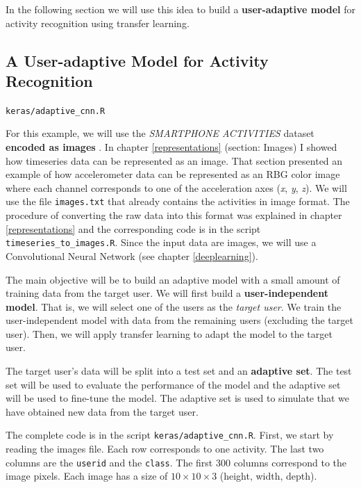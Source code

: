 \documentclass[
  11pt,
]{krantz}
\makeatletter
\newenvironment{kframe}{%
\medskip{}
\setlength{\fboxsep}{.8em}
 \def\at@end@of@kframe{}%
 \ifinner\ifhmode%
  \def\at@end@of@kframe{\end{minipage}}%
  \begin{minipage}{\columnwidth}%
 \fi\fi%
 \def\FrameCommand##1{\hskip\@totalleftmargin \hskip-\fboxsep
 \colorbox{shadecolor}{##1}\hskip-\fboxsep
     \hskip-\linewidth \hskip-\@totalleftmargin \hskip\columnwidth}%
 \MakeFramed {\advance\hsize-\width
   \@totalleftmargin\z@ \linewidth\hsize
   \@setminipage}}%
 {\par\unskip\endMakeFramed%
 \at@end@of@kframe}
\newenvironment{rmdblock}[1]
  {
  \begin{itemize}
  \renewcommand{\labelitemi}{
    \raisebox{-.7\height}[0pt][0pt]{
      {\setkeys{Gin}{width=3em,keepaspectratio}\texttt{[image: images/icons/\#1]}}
    }
  }
  \setlength{\fboxsep}{1em}
  \begin{kframe}
  \item
  }
  {
  \end{kframe}
  \end{itemize}
  }
\newenvironment{rmdfolder}
  {\begin{rmdblock}{folder}}
  {\end{rmdblock}}
\makeatother
\begin{document}
In the following section we will use this idea to build a \textbf{user-adaptive model} for activity recognition using transfer learning.

\hypertarget{a-user-adaptive-model-for-activity-recognition}{%
\subsection{A User-adaptive Model for Activity Recognition}\label{a-user-adaptive-model-for-activity-recognition}}

\begin{rmdfolder}
\texttt{keras/adaptive\_cnn.R}
\end{rmdfolder}

For this example, we will use the \emph{SMARTPHONE ACTIVITIES} dataset \textbf{encoded as images }. In chapter \ref{representations} (section: Images) I showed how timeseries data can be represented as an image. That section presented an example of how accelerometer data can be represented as an RBG color image where each channel corresponds to one of the acceleration axes (\emph{x}, \emph{y}, \emph{z}). We will use the file \texttt{images.txt} that already contains the activities in image format. The procedure of converting the raw data into this format was explained in chapter \ref{representations} and the corresponding code is in the script \texttt{timeseries\_to\_images.R}. Since the input data are images, we will use a Convolutional Neural Network (see chapter \ref{deeplearning}).

The main objective will be to build an adaptive model with a small amount of training data from the target user. We will first build a \textbf{user-independent model}. That is, we will select one of the users as the \emph{target user}. We train the user-independent model with data from the remaining users (excluding the target user). Then, we will apply transfer learning to adapt the model to the target user.

The target user's data will be split into a test set and an \textbf{adaptive set}. The test set will be used to evaluate the performance of the model and the adaptive set will be used to fine-tune the model. The adaptive set is used to simulate that we have obtained new data from the target user.

The complete code is in the script \texttt{keras/adaptive\_cnn.R}. First, we start by reading the images file. Each row corresponds to one activity. The last two columns are the \texttt{userid} and the \texttt{class}. The first \(300\) columns correspond to the image pixels. Each image has a size of \(10 \times 10 \times 3\) (height, width, depth).
\end{document}
